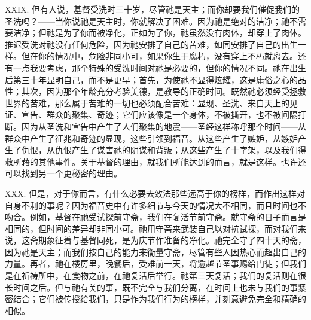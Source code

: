 XXIX. 但有人说，基督受洗时三十岁，尽管祂是天主；而你却要我们催促我们的圣洗吗？——当你说祂是天主时，你就解决了困难。因为祂是绝对的洁净；祂不需要洁净；但祂是为了你而被净化，正如为了你，祂虽然没有肉体，却穿上了肉体。推迟受洗对祂没有任何危险，因为祂安排了自己的苦难，如同安排了自己的出生一样。但在你的情况中，危险非同小可，如果你生于腐朽，没有穿上不朽就离去。还有一点我要考虑，那个特殊的受洗时间对祂是必要的，但你的情况不同。祂在出生后第三十年显明自己，而不是更早；首先，为使祂不显得炫耀，这是庸俗之心的品性；其次，因为那个年龄充分考验美德，是教导的正确时间。既然祂必须经受拯救世界的苦难，那么属于苦难的一切也必须配合苦难：显现、圣洗、来自天上的见证、宣告、群众的聚集、奇迹；它们应该像是一个身体，不被撕开，也不被间隔打断。因为从圣洗和宣告中产生了人们聚集的地震——圣经这样称呼那个时间——从群众中产生了征兆和奇迹的显现，这些引领到福音。从这些产生了嫉妒，从嫉妒产生了仇恨，从仇恨产生了谋害祂的阴谋和背叛；从这些产生了十字架，以及我们得救所藉的其他事件。关于基督的理由，就我们所能达到的而言，就是这样。也许还可以找到另一个更秘密的理由。\par

XXX. 但是，对于你而言，有什么必要去效法那些远高于你的榜样，而作出这样对自身不利的事呢？因为福音史中有许多细节与今天的情况大不相同，而且时间也不吻合。例如，基督在祂受试探前守斋，我们在复活节前守斋。就守斋的日子而言是相同的，但时间的差异却非同小可。祂用守斋来武装自己以对抗试探，而对我们来说，这斋期象征着与基督同死，是为庆节作准备的净化。祂完全守了四十天的斋，因为祂是天主；而我们按自己的能力来衡量守斋，尽管有些人因热心而超出自己的力量。再者，祂在楼房里，晚餐后，受难前一天，将逾越节圣事赐给门徒；但我们是在祈祷所中，在食物之前，在祂复活后举行。祂第三天复活；我们的复活则在很长时间之后。但与祂有关的事，既不完全与我们分离，在时间上也未与我们的事紧密结合；它们被传授给我们，只是作为我们行为的榜样，并刻意避免完全和精确的相似。\par

